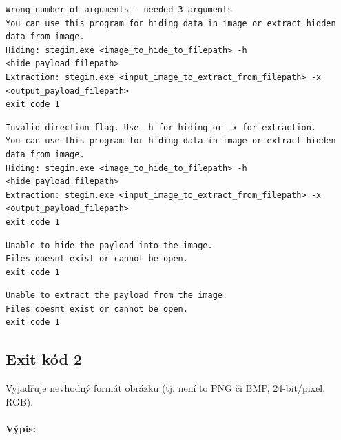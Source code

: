 \documentclass[12pt]{report}
\begin{document}
    \begin{mdframed}
        \begin{verbatim}
Wrong number of arguments - needed 3 arguments
You can use this program for hiding data in image or extract hidden data from image.
Hiding: stegim.exe <image_to_hide_to_filepath> -h <hide_payload_filepath>
Extraction: stegim.exe <input_image_to_extract_from_filepath> -x <output_payload_filepath>
exit code 1
        \end{verbatim}
    \end{mdframed}

    \begin{mdframed}
        \begin{verbatim}
Invalid direction flag. Use -h for hiding or -x for extraction.
You can use this program for hiding data in image or extract hidden data from image.
Hiding: stegim.exe <image_to_hide_to_filepath> -h <hide_payload_filepath>
Extraction: stegim.exe <input_image_to_extract_from_filepath> -x <output_payload_filepath>
exit code 1
        \end{verbatim}
    \end{mdframed}

    \begin{mdframed}
        \begin{verbatim}
Unable to hide the payload into the image.
Files doesnt exist or cannot be open.
exit code 1
        \end{verbatim}
    \end{mdframed}

    \begin{mdframed}
        \begin{verbatim}
Unable to extract the payload from the image.
Files doesnt exist or cannot be open.
exit code 1
        \end{verbatim}
    \end{mdframed}

    \subsection{Exit kód 2}
    Vyjadřuje nevhodný formát obrázku (tj. není to PNG či BMP, 24-bit/pixel,
    RGB).\\

    \paragraph{Výpis:}
\end{document}
